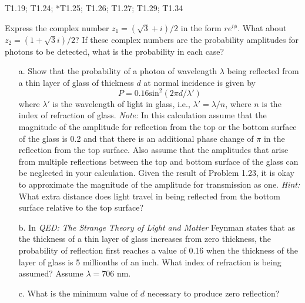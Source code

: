 \documentclass[11pt,letterpaper,boxed,noheader]{pset}
\begin{document}
    \begin{center}
        T1.19; T1.24; *T1.25; T1.26; T1.27; T1.29; T1.34
    \end{center}
    
    
    \begin{problem} [T1.19]
        Express the complex number $z_1 = (\sqrt{3}+i)/2$ in the form $re^{i\phi}$. What about $z_2 = (1 + \sqrt{3}i)/2$? If these complex numbers are the probability amplitudes for photons to be detected, what is the probability in each case?
    \end{problem}
    \newpage
    
    \begin{problem} [T1.24]
        \begin{enumerate}
            \item [a.] Show that the probability of a photon of wavelength $\lambda$ being reflected from a thin layer of glass of thickness $d$ at normal incidence is given by 
            \[ P = 0.16 \text{sin}^2 (2 \pi d / \lambda')\]
            where $\lambda'$ is the wavelength of light in glass, i.e., $\lambda' = \lambda/n$, where $n$ is the index of refraction of glass. \textit{Note:} In this calculation assume that the magnitude of the amplitude for reflection from the top or the bottom surface of the glass is 0.2 and that there is an additional phase change of $\pi$ in the reflection from the top surface. Also assume that the amplitudes that arise from multiple reflections between the top and bottom surface of the glass can be neglected in your calculation. Given the result of Problem 1.23, it is okay to approximate the magnitude of the amplitude for transmission as one. \textit{Hint:} What extra distance does light travel in being reflected from the bottom surface relative to the top surface?
            \item [b.] In \textit{QED: The Strange Theory of Light and Matter} Feynman states that as the thickness of a thin layer of glass increases from zero thickness, the probability of reflection first reaches a value of 0.16 when the thickness of the layer of glass is 5 millionths of an inch. What index of refraction is being assumed? Assume $\lambda = 706$ nm. 
            \item [c.] What is the minimum value of $d$ necessary to produce zero reflection?
        \end{enumerate}
    \end{problem}
    \newpage
    
\end{document}
